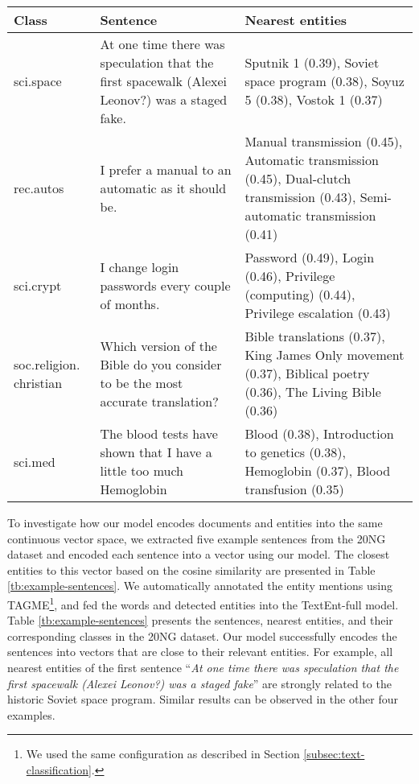 \documentclass[11pt]{article}
\begin{document}
  \begin{table*}[t]
    \centering
    \begin{tabular}{p{1.8cm}|p{5.5cm}|p{7cm}}
      Class & Sentence  & Nearest entities\\
      \hline
      sci.space &
      At one time there was speculation that the first spacewalk (Alexei Leonov?) was a staged fake. &
      Sputnik 1 (0.39),
      Soviet space program (0.38),
      Soyuz 5 (0.38),
      Vostok 1 (0.37)
      \\
      \hline
      rec.autos &
      I prefer a manual to an automatic as it should be. &
      Manual transmission (0.45),
      Automatic transmission (0.45),
      Dual-clutch transmission (0.43),
      Semi-automatic transmission (0.41)
      \\
      \hline
      sci.crypt &
      I change login passwords every couple of months. &
      Password (0.49),
      Login (0.46),
      Privilege (computing) (0.44),
      Privilege escalation (0.43)
      \\
      \hline
      soc.religion. christian &
      Which version of the Bible do you consider to be the most accurate translation? &
      Bible translations (0.37),
      King James Only movement (0.37),
      Biblical poetry (0.36),
      The Living Bible (0.36)
      \\
      \hline
      sci.med &
      The blood tests have shown that I have a little too much Hemoglobin &
      Blood (0.38),
      Introduction to genetics (0.38),
      Hemoglobin (0.37),
      Blood transfusion (0.35)
      \\
    \end{tabular}
    \caption{Five example sentences with their top nearest entities using the TextEnt model.}
    \label{tb:example-sentences}
  \end{table*}
  To investigate how our model encodes documents and entities into the same continuous vector space, we extracted five example sentences from the 20NG dataset and encoded each sentence into a vector using our model. The closest entities to this vector based on the cosine similarity are presented in Table \ref{tb:example-sentences}.
  We automatically annotated the entity mentions using TAGME\footnote{We used the same configuration as described in Section \ref{subsec:text-classification}.}, and fed the words and detected entities into the TextEnt-full model.
  Table \ref{tb:example-sentences} presents the sentences, nearest entities, and their corresponding classes in the 20NG dataset.
  Our model successfully encodes the sentences into vectors that are close to their relevant entities.
  For example, all nearest entities of the first sentence ``\textit{At one time there was speculation that the first spacewalk (Alexei Leonov?) was a staged fake}'' are strongly related to the historic Soviet space program.
  Similar results can be observed in the other four examples.
\end{document}
